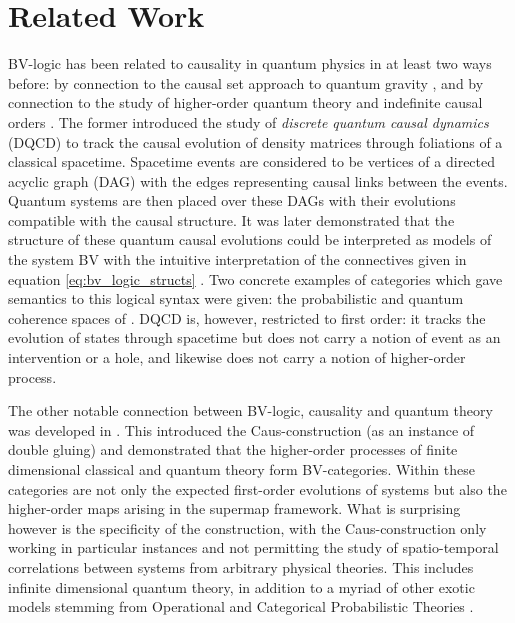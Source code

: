 \section{Related Work}
BV-logic has been related to causality in quantum physics in at least two ways before: by connection to the causal set approach to quantum gravity \cite{blute_quantum_causal_dynamics,blute_logical_basis}, and by connection to the study of higher-order quantum theory and indefinite causal orders \cite{kissinger_caus,SimmonsKissinger2022}.
The former \cite{blute_quantum_causal_dynamics} introduced the study of \textit{discrete quantum causal dynamics} (DQCD) to track the causal evolution of density matrices through foliations of a classical spacetime.
Spacetime events are considered to be vertices of a directed acyclic graph (DAG) with the edges representing causal links between the events.
Quantum systems are then placed over these DAGs with their evolutions compatible with the causal structure.
It was later demonstrated that the structure of these quantum causal evolutions could be interpreted as models of the system BV with the intuitive interpretation of the connectives given in equation \eqref{eq:bv_logic_structs} \cite{blute_logical_basis}.
Two concrete examples of categories which gave semantics to this logical syntax were given: the probabilistic and quantum coherence spaces of \cite{girard_coherence_spaces}.
DQCD is, however, restricted to first order: it tracks the evolution of states through spacetime but does not carry a notion of event as an intervention or a hole, and likewise does not carry a notion of higher-order process. 


The other notable connection between BV-logic, causality and quantum theory was developed in \cite{kissinger_caus,SimmonsKissinger2022}.
This introduced the Caus-construction (as an instance of double gluing) and demonstrated that the higher-order processes of finite dimensional classical and quantum theory form BV-categories.
Within these categories are not only the expected first-order evolutions of systems but also the higher-order maps arising in the supermap framework.
What is surprising however is the specificity of the construction, with the Caus-construction only working in particular instances and not permitting the study of spatio-temporal correlations between systems from arbitrary physical theories.
This includes infinite dimensional quantum theory, in addition to a myriad of other exotic models stemming from Operational and Categorical Probabilistic Theories \cite{chiribella_purification,gogioso_cpt}.

